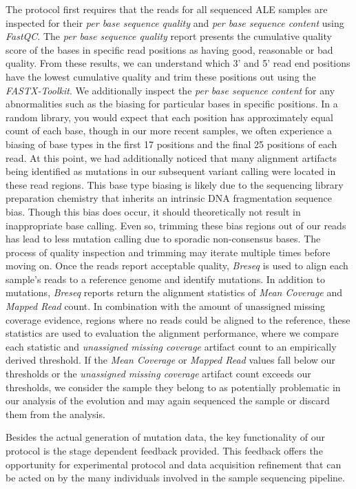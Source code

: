 \documentclass[12pt,final,masters,chapterheads]{ucsd}  %
\begin{document}
The protocol first requires that the reads for all sequenced ALE samples are inspected for their \textit{per base sequence quality} and \textit{per base sequence content} using \textit{FastQC}. The \textit{per base sequence quality} report presents the cumulative quality score of the bases in specific read positions as having good, reasonable or bad quality. From these results, we can understand which 3' and 5' read end positions have the lowest cumulative quality and trim these positions out using the \textit{FASTX-Toolkit}. We additionally inspect the \textit{per base sequence content} for any abnormalities such as the biasing for particular bases in specific positions. In a random library, you would expect that each position has approximately equal count of each base, though in our more recent samples, we often experience a biasing of base types in the first 17 positions and the final 25 positions of each read. At this point, we had additionally noticed that many alignment artifacts being identified as mutations in our subsequent variant calling were located in these read regions. This base type biasing is likely due to the sequencing library preparation chemistry that inherits an intrinsic DNA fragmentation sequence bias. Though this bias does occur, it should theoretically not result in inappropriate base calling. Even so, trimming these bias regions out of our reads has lead to less mutation calling due to sporadic non-consensus bases. The process of quality inspection and trimming may iterate multiple times before moving on. Once the reads report acceptable quality, \textit{Breseq} is used to align each sample's reads to a reference genome and identify mutations. In addition to mutations, \textit{Breseq} reports return the alignment statistics of \textit{Mean Coverage} and \textit{Mapped Read} count. In combination with the amount of unassigned missing coverage evidence, regions where no reads could be aligned to the reference, these statistics are used to evaluation the alignment performance, where we compare each statistic and \textit{unassigned missing coverage} artifact count to an empirically derived threshold. If the \textit{Mean Coverage} or \textit{Mapped Read} values fall below our thresholds or the \textit{unassigned missing coverage} artifact count exceeds our thresholds, we consider the sample they belong to as potentially problematic in our analysis of the evolution and may again sequenced the sample or discard them from the analysis.

Besides the actual generation of mutation data, the key functionality of our protocol is the stage dependent feedback provided. This feedback offers the opportunity for experimental protocol and data acquisition refinement that can be acted on by the many individuals involved in the sample sequencing pipeline.
\end{document}
